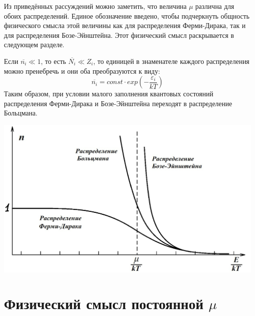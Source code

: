 \documentclass[A4]{article}
\begin{document}
    Из приведённых рассуждений можно заметить, что величина $\mu$ различна для обоих распределений.
    Единое обозначение введено, чтобы подчеркнуть общность физического смысла этой величины как для
    распределения Ферми-Дирака, так и для распределения Бозе-Эйнштейна. Этот физический смысл
    раскрывается в следующем разделе.

    Если $\overline{n_i} \ll 1$, то есть $\overline{N_i} \ll Z_i$, то единицей в знаменателе
    каждого распределения можно пренебречь и они оба преобразуются к виду:
    \begin{equation*}
        \overline{n_i} = const \cdot exp\left(-\frac{\varepsilon_i}{kT}\right)
    \end{equation*}
    Таким образом, при условии малого заполнения квантовых состояний распределения Ферми-Дирака и
    Бозе-Эйнштейна переходят в распределение Больцмана.

    \begin{center}
        \includegraphics[width = 15cm]{stats.png}
    \end{center}

\newpage

\section{Физический смысл постоянной $\mu$}
\end{document}
